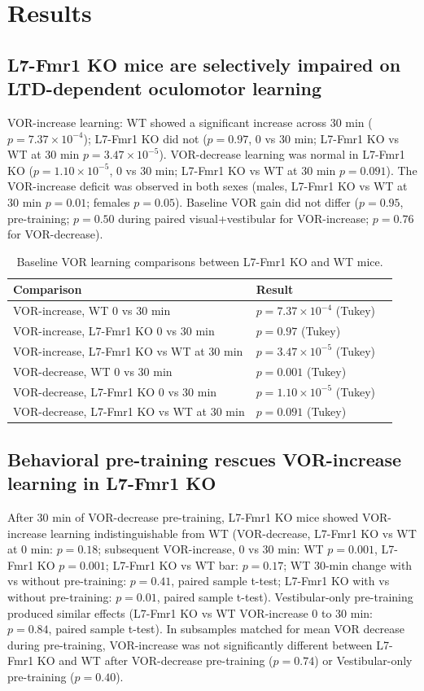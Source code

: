 \documentclass[11pt]{article}
\begin{document}
\section{Results}
\subsection{L7-Fmr1 KO mice are selectively impaired on LTD-dependent oculomotor learning}
VOR-increase learning: WT showed a significant increase across 30 min ($p = 7.37\times10^{-4}$); L7-Fmr1 KO did not ($p = 0.97$, 0 vs 30 min; L7-Fmr1 KO vs WT at 30 min $p = 3.47\times10^{-5}$). VOR-decrease learning was normal in L7-Fmr1 KO ($p = 1.10\times10^{-5}$, 0 vs 30 min; L7-Fmr1 KO vs WT at 30 min $p = 0.091$). The VOR-increase deficit was observed in both sexes (males, L7-Fmr1 KO vs WT at 30 min $p = 0.01$; females $p = 0.05$). Baseline VOR gain did not differ ($p = 0.95$, pre-training; $p = 0.50$ during paired visual+vestibular for VOR-increase; $p = 0.76$ for VOR-decrease).

\begin{table}[h]
\centering
\caption{Baseline VOR learning comparisons between L7-Fmr1 KO and WT mice.}
\begin{tabular}{lll}
\toprule
Comparison & Result \\
\midrule
VOR-increase, WT 0 vs 30 min & $p = 7.37\times10^{-4}$ (Tukey) \\
VOR-increase, L7-Fmr1 KO 0 vs 30 min & $p = 0.97$ (Tukey) \\
VOR-increase, L7-Fmr1 KO vs WT at 30 min & $p = 3.47\times10^{-5}$ (Tukey) \\
VOR-decrease, WT 0 vs 30 min & $p = 0.001$ (Tukey) \\
VOR-decrease, L7-Fmr1 KO 0 vs 30 min & $p = 1.10\times10^{-5}$ (Tukey) \\
VOR-decrease, L7-Fmr1 KO vs WT at 30 min & $p = 0.091$ (Tukey) \\
\bottomrule
\end{tabular}
\end{table}

\subsection{Behavioral pre-training rescues VOR-increase learning in L7-Fmr1 KO}
After 30 min of VOR-decrease pre-training, L7-Fmr1 KO mice showed VOR-increase learning indistinguishable from WT (VOR-decrease, L7-Fmr1 KO vs WT at 0 min: $p = 0.18$; subsequent VOR-increase, 0 vs 30 min: WT $p = 0.001$, L7-Fmr1 KO $p = 0.001$; L7-Fmr1 KO vs WT bar: $p = 0.17$; WT 30-min change with vs without pre-training: $p = 0.41$, paired sample t-test; L7-Fmr1 KO with vs without pre-training: $p = 0.01$, paired sample t-test). Vestibular-only pre-training produced similar effects (L7-Fmr1 KO vs WT VOR-increase 0 to 30 min: $p = 0.84$, paired sample t-test). In subsamples matched for mean VOR decrease during pre-training, VOR-increase was not significantly different between L7-Fmr1 KO and WT after VOR-decrease pre-training ($p = 0.74$) or Vestibular-only pre-training ($p = 0.40$).
\end{document}

